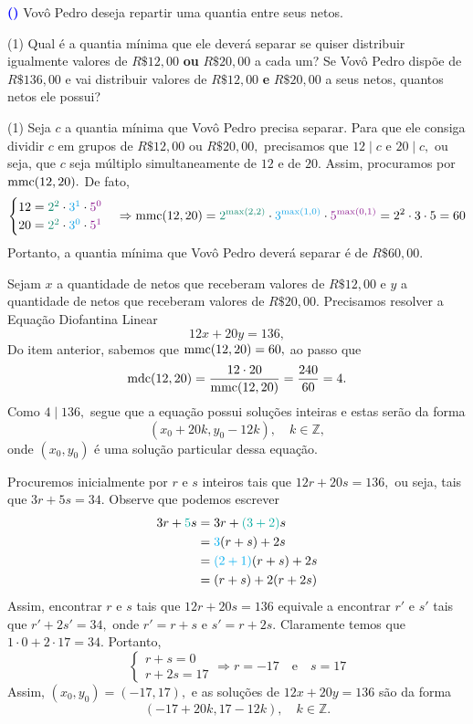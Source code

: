 \documentclass[12pt, a4paper]{article}
\newcommand{\mdc}{{\rm mdc}}
\newcommand{\mmc}{{\rm mmc}}
\newcommand{\negrito}[1]{\mbox{\boldmath{$#1$}}}
\newcounter{exercicio}[section]
\newenvironment{exercicio}[1][]{\refstepcounter{exercicio}\par\medskip
 \textcolor{blue}{\bf(\theexercicio)} \rmfamily}{\medskip }
\newcommand{\itens}[1]{\begin{tasks}[label={(tsk[a])},label-width=3.6ex, label-format = {\bfseries}, column-sep = {0pt}](1) #1\end{tasks}}
\newcommand{\alt}[1]{\textcolor{Floresta}{$\negrito{(#1)} $}}
\begin{document}
\begin{exercicio}
Vovô Pedro deseja repartir uma quantia entre seus netos. 
\itens{
\task[\alt{a}] Qual é a quantia mínima que ele deverá separar se quiser distribuir igualmente valores de $R\$ 12,00$ \textbf{ou} $R\$ 20,00$ a cada um?
\task[\alt{b}] Se Vovô Pedro dispõe de $R\$ 136,00$ e vai distribuir valores de $R\$ 12,00$ \textbf{e} $R\$ 20,00$ a seus netos, quantos netos ele possui?
}
\end{exercicio}
\begin{solution}
\itens{
\task[\alt{a}] Seja $c$ a quantia mínima que Vovô Pedro precisa separar. Para que ele consiga dividir $c$ em grupos de $R\$ 12,00$ ou $R\$ 20,00,$ precisamos que $12 \mid c$ e $20 \mid c,$ ou seja, que $c$ seja múltiplo simultaneamente de $12$ e de $20.$ Assim, procuramos por $\mmc(12, 20).$ 
De fato, 
\[
\begin{cases}
12 = \textcolor{PineGreen}{2^{2}} \cdot \textcolor{Cerulean}{3^{1}} \cdot \textcolor{Plum}{5^{0}} \\
20 =\textcolor{PineGreen}{2^{2}} \cdot \textcolor{Cerulean}{3^{0}} \cdot \textcolor{Plum}{5^{1}}
\end{cases} \Rightarrow \mmc(12,20) = \textcolor{PineGreen}{2^{\max(2,2)}} \cdot \textcolor{Cerulean}{3^{\max(1,0)}} \cdot  \textcolor{Plum}{5^{\max(0,1)}} = 2^2 \cdot 3 \cdot 5 = 60
\]
Portanto, a quantia mínima que Vovô Pedro deverá separar é de $R\$ 60,00.$

\task[\alt{b}] Sejam $x$ a quantidade de netos que receberam valores de $R\$ 12,00$ e $y$ a quantidade de netos que receberam valores de $R\$ 20,00.$ Precisamos resolver a Equação Diofantina Linear
\[
12x + 20y = 136,
\]
Do item anterior, sabemos que $\mmc(12,20) = 60,$ ao passo que
\[
\mdc(12,20) = \dfrac{12 \cdot 20}{\mmc(12,20)} = \dfrac{240}{60} = 4.
\]
Como $4 \mid 136,$ segue que a equação possui soluções inteiras e estas serão da forma 
	\[
	(x_0 + 20k, y_0 - 12k), \quad k \in \mathbb{Z},
	\]
	onde $(x_0, y_0)$ é uma solução particular dessa equação. 
	
	Procuremos inicialmente por $r$ e $s$ inteiros tais que $12r + 20s = 136,$ ou seja, tais que $3r+5s = 34.$ 
Observe que podemos escrever
	\begin{align*}
	3r + \textcolor{Emerald}{5}s &= 3r + \textcolor{Emerald}{(3+2)}s \\&= \textcolor{Cyan}{3}(r+s) + 2s \\&= \textcolor{Cyan}{(2+1)}(r+s) + 2s \\&= (r+s) + 2(r+2s)
	\end{align*}
	Assim, encontrar $r$ e $s$ tais que $12r+20s = 136$ equivale a encontrar $r'$ e $s'$ tais que $r'+2s' = 34,$ onde $r' = r+s$ e $s' = r+2s.$ Claramente temos que $1 \cdot 0 + 2 \cdot 17 = 34.$ Portanto,
	\[
	\begin{cases}
	r+s = 0 \\
	r+2s = 17
	\end{cases} \Rightarrow r = -17 \quad \mbox{e} \quad s = 17
	\]
	Assim, $(x_0, y_0) = (-17,17),$ e as soluções de $12x + 20y = 136$ são da forma
	\[
	(-17 + 20k, 17 - 12k), \quad k \in \mathbb{Z}.
	\]

}
\end{solution}
\end{document}
